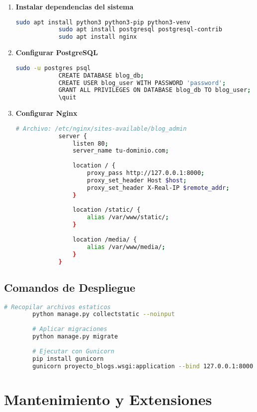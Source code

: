 \documentclass[11pt,a4paper]{report}
\begin{document}
	\begin{enumerate}
		\item \textbf{Instalar dependencias del sistema}
		\begin{lstlisting}[language=bash]
			sudo apt install python3 python3-pip python3-venv
			sudo apt install postgresql postgresql-contrib
			sudo apt install nginx
		\end{lstlisting}
		
		\item \textbf{Configurar PostgreSQL}
		\begin{lstlisting}[language=bash]
			sudo -u postgres psql
			CREATE DATABASE blog_db;
			CREATE USER blog_user WITH PASSWORD 'password';
			GRANT ALL PRIVILEGES ON DATABASE blog_db TO blog_user;
			\quit
		\end{lstlisting}
		
		\item \textbf{Configurar Nginx}
		\begin{lstlisting}[language=bash]
			# Archivo: /etc/nginx/sites-available/blog_admin
			server {
				listen 80;
				server_name tu-dominio.com;
				
				location / {
					proxy_pass http://127.0.0.1:8000;
					proxy_set_header Host $host;
					proxy_set_header X-Real-IP $remote_addr;
				}
				
				location /static/ {
					alias /var/www/static/;
				}
				
				location /media/ {
					alias /var/www/media/;
				}
			}
		\end{lstlisting}
	\end{enumerate}
	
	\subsection{Comandos de Despliegue}
	
	\begin{lstlisting}[language=bash]
		# Recopilar archivos estaticos
		python manage.py collectstatic --noinput
		
		# Aplicar migraciones
		python manage.py migrate
		
		# Ejecutar con Gunicorn
		pip install gunicorn
		gunicorn proyecto_blogs.wsgi:application --bind 127.0.0.1:8000
	\end{lstlisting}
	
	\section{Mantenimiento y Extensiones}
	
\end{document}
